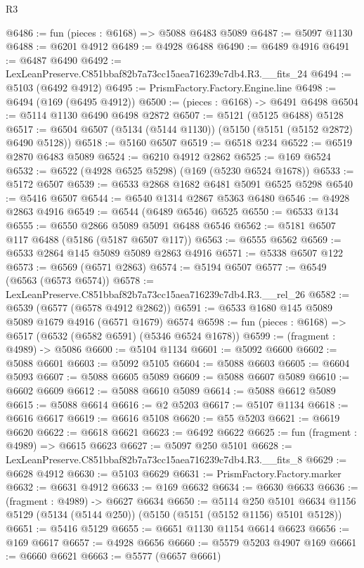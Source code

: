 \begin{lexlean}{R3}
\begin{coremodule}
@6486 := fun (pieces : @6168) => @5088 @6483 @5089
@6487 := @5097 @1130
@6488 := @6201 @4912
@6489 := @4928 @6488
@6490 := @6489 @4916
@6491 := @6487 @6490
@6492 := LexLeanPreserve.C851bbaf82b7a73cc15aea716239c7db4.R3.__fits_24
@6494 := @5103 (@6492 @4912)
@6495 := PrismFactory.Factory.Engine.line
@6498 := @6494 (@169 (@6495 @4912))
@6500 := (pieces : @6168) -> @6491 @6498
@6504 := @5114 @1130 @6490 @6498 @2872
@6507 := @5121 (@5125 @6488) @5128
@6517 := @6504 @6507 (@5134 (@5144 @1130)) (@5150 (@5151 (@5152 @2872) @6490 @5128))
@6518 := @5160 @6507
@6519 := @6518 @234
@6522 := @6519 @2870 @6483 @5089
@6524 := @6210 @4912 @2862
@6525 := @169 @6524
@6532 := @6522 (@4928 @6525 @5298) (@169 (@5230 @6524 @1678))
@6533 := @5172 @6507
@6539 := @6533 @2868 @1682 @6481 @5091 @6525 @5298
@6540 := @5416 @6507
@6544 := @6540 @1314 @2867 @5363 @6480
@6546 := @4928 @2863 @4916
@6549 := @6544 (@6489 @6546) @6525
@6550 := @6533 @134
@6555 := @6550 @2866 @5089 @5091 @6488 @6546
@6562 := @5181 @6507 @117 @6488 (@5186 (@5187 @6507 @117))
@6563 := @6555 @6562
@6569 := @6533 @2864 @145 @5089 @5089 @2863 @4916
@6571 := @5338 @6507 @122
@6573 := @6569 (@6571 @2863)
@6574 := @5194 @6507
@6577 := @6549 (@6563 (@6573 @6574))
@6578 := LexLeanPreserve.C851bbaf82b7a73cc15aea716239c7db4.R3.__rel_26
@6582 := @6539 (@6577 (@6578 @4912 @2862))
@6591 := @6533 @1680 @145 @5089 @5089 @1679 @4916 (@6571 @1679) @6574
@6598 := fun (pieces : @6168) => @6517 (@6532 (@6582 @6591) (@5346 @6524 @1678))
@6599 := (fragment : @4989) -> @5086
@6600 := @5104 @1134
@6601 := @5092 @6600
@6602 := @5088 @6601
@6603 := @5092 @5105
@6604 := @5088 @6603
@6605 := @6604 @5093
@6607 := @5088 @6605 @5089
@6609 := @5088 @6607 @5089
@6610 := @6602 @6609
@6612 := @5088 @6610 @5089
@6614 := @5088 @6612 @5089
@6615 := @5088 @6614
@6616 := @2 @5203
@6617 := @5107 @1134
@6618 := @6616 @6617
@6619 := @6616 @5108
@6620 := @55 @5203
@6621 := @6619 @6620
@6622 := @6618 @6621
@6623 := @6492 @6622
@6625 := fun (fragment : @4989) => @6615 @6623
@6627 := @5097 @250 @5101
@6628 := LexLeanPreserve.C851bbaf82b7a73cc15aea716239c7db4.R3.__fits_8
@6629 := @6628 @4912
@6630 := @5103 @6629
@6631 := PrismFactory.Factory.marker
@6632 := @6631 @4912
@6633 := @169 @6632
@6634 := @6630 @6633
@6636 := (fragment : @4989) -> @6627 @6634
@6650 := @5114
    @250
    @5101
    @6634
    @1156
    @5129
    (@5134 (@5144 @250))
    (@5150 (@5151 (@5152 @1156) @5101 @5128))
@6651 := @5416 @5129
@6655 := @6651 @1130 @1154 @6614 @6623
@6656 := @169 @6617
@6657 := @4928 @6656
@6660 := @5579 @5203 @4907 @169
@6661 := @6660 @6621
@6663 := @5577 (@6657 @6661)

\end{coremodule}
\end{lexlean}
